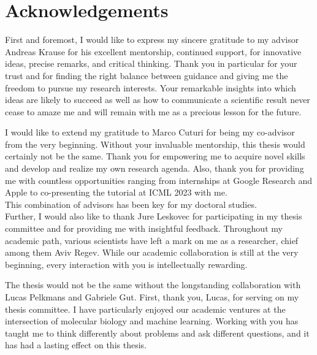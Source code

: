 
\bigskip

\begingroup
\let\clearpage\relax
\let\cleardoublepage\relax
\let\cleardoublepage\relax
\chapter*{Acknowledgements}

\def\thanks#1{%
\begingroup
\leftskip1em
\noindent #1
\par
\endgroup
}

First and foremost, I would like to express my sincere gratitude to my advisor Andreas Krause for his excellent mentorship, continued support, for innovative ideas, precise remarks, and critical thinking.
Thank you in particular for your trust and for finding the right balance between guidance and giving me the freedom to pursue my research interests.
Your remarkable insights into which ideas are likely to succeed as well as how to communicate a scientific result never cease to amaze me and will remain with me as a precious lesson for the future.

I would like to extend my gratitude to Marco Cuturi for being my co-advisor from the very beginning. 
Without your invaluable mentorship, this thesis would certainly not be the same. Thank you for empowering me to acquire novel skills and develop and realize my own research agenda.
Also, thank you for providing me with countless opportunities ranging from internships at Google Research and Apple to co-presenting the tutorial at ICML 2023 with me. \\
This combination of advisors has been key for my doctoral studies. \\

Further, I would also like to thank Jure Leskovec for participating in my thesis committee and for providing me with insightful feedback. 
Throughout my academic path, various scientists have left a mark on me as a researcher, chief among them Aviv Regev. While our academic collaboration is still at the very beginning, every interaction with you is intellectually rewarding.

 The thesis would not be the same without the longstanding collaboration with Lucas Pelkmans and Gabriele Gut. First, thank you, Lucas, for serving on my thesis committee.
I have particularly enjoyed our academic ventures at the intersection  of molecular biology and machine learning. Working with you has taught me to think differently about problems and ask different questions, and it has had a lasting effect on this thesis.

